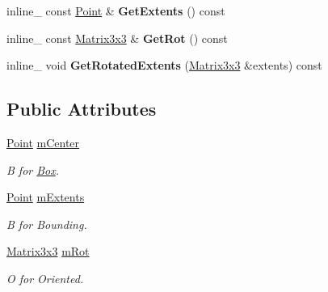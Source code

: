 \begin{DoxyCompactItemize}
\item 
inline\+\_\+ const \hyperlink{classPoint}{Point} \& {\bfseries Get\+Extents} () const \hypertarget{classOBB_a477e282d9ef3bf14c26954680efb0d84}{}\label{classOBB_a477e282d9ef3bf14c26954680efb0d84}

\item 
inline\+\_\+ const \hyperlink{classMatrix3x3}{Matrix3x3} \& {\bfseries Get\+Rot} () const \hypertarget{classOBB_a2902f319a991ea9b72d008a4cafd0167}{}\label{classOBB_a2902f319a991ea9b72d008a4cafd0167}

\item 
inline\+\_\+ void {\bfseries Get\+Rotated\+Extents} (\hyperlink{classMatrix3x3}{Matrix3x3} \&extents) const \hypertarget{classOBB_a0c73873d2bdec88f3c3fea69182ed3dc}{}\label{classOBB_a0c73873d2bdec88f3c3fea69182ed3dc}

\end{DoxyCompactItemize}
\subsection*{Public Attributes}
\begin{DoxyCompactItemize}
\item 
\hyperlink{classPoint}{Point} \hyperlink{classOBB_ae22187acfbcf25d8bee6499760f498ce}{m\+Center}\hypertarget{classOBB_ae22187acfbcf25d8bee6499760f498ce}{}\label{classOBB_ae22187acfbcf25d8bee6499760f498ce}

\begin{DoxyCompactList}\small\item\em B for \hyperlink{classBox}{Box}. \end{DoxyCompactList}\item 
\hyperlink{classPoint}{Point} \hyperlink{classOBB_af3d0e54015e068ce9f9d3d8b7a8e84c5}{m\+Extents}\hypertarget{classOBB_af3d0e54015e068ce9f9d3d8b7a8e84c5}{}\label{classOBB_af3d0e54015e068ce9f9d3d8b7a8e84c5}

\begin{DoxyCompactList}\small\item\em B for Bounding. \end{DoxyCompactList}\item 
\hyperlink{classMatrix3x3}{Matrix3x3} \hyperlink{classOBB_a777721a9bbdda31e6a73b42028576393}{m\+Rot}\hypertarget{classOBB_a777721a9bbdda31e6a73b42028576393}{}\label{classOBB_a777721a9bbdda31e6a73b42028576393}

\begin{DoxyCompactList}\small\item\em O for Oriented. \end{DoxyCompactList}\end{DoxyCompactItemize}


